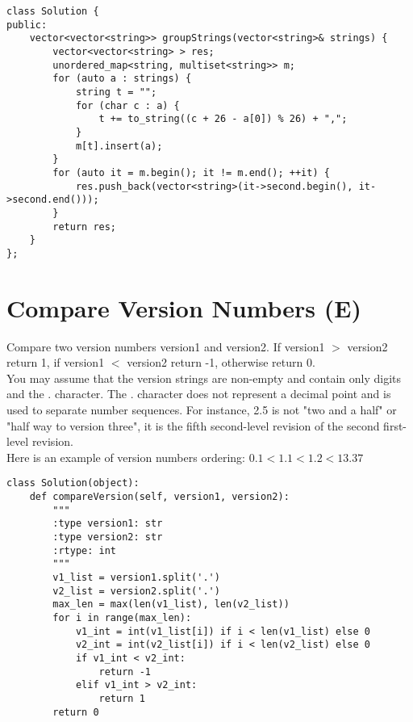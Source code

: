 \begin{lstlisting}
class Solution {
public:
    vector<vector<string>> groupStrings(vector<string>& strings) {
        vector<vector<string> > res;
        unordered_map<string, multiset<string>> m;
        for (auto a : strings) {
            string t = "";
            for (char c : a) {
                t += to_string((c + 26 - a[0]) % 26) + ",";
            }
            m[t].insert(a);
        }
        for (auto it = m.begin(); it != m.end(); ++it) {
            res.push_back(vector<string>(it->second.begin(), it->second.end()));
        }
        return res;
    }
};
\end{lstlisting}


\section{Compare Version Numbers (E)}
Compare two version numbers version1 and version2. If version1 $>$ version2 return 1, if version1 $<$ version2 return -1, otherwise return 0.\\

You may assume that the version strings are non-empty and contain only digits and the . character.
The . character does not represent a decimal point and is used to separate number sequences.
For instance, 2.5 is not "two and a half" or "half way to version three", it is the fifth second-level revision of the second first-level revision.\\

Here is an example of version numbers ordering: $0.1 < 1.1 < 1.2 < 13.37$\\

\begin{lstlisting}
class Solution(object):
    def compareVersion(self, version1, version2):
        """
        :type version1: str
        :type version2: str
        :rtype: int
        """
        v1_list = version1.split('.')
        v2_list = version2.split('.')
        max_len = max(len(v1_list), len(v2_list))
        for i in range(max_len):
            v1_int = int(v1_list[i]) if i < len(v1_list) else 0
            v2_int = int(v2_list[i]) if i < len(v2_list) else 0
            if v1_int < v2_int:
                return -1
            elif v1_int > v2_int:
                return 1
        return 0
\end{lstlisting}
        

